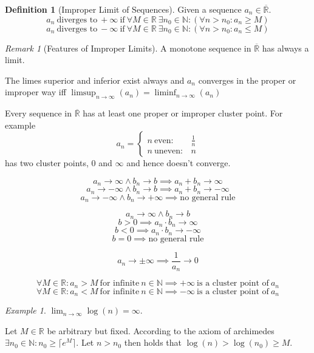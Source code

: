 \documentclass[english,titlepage]{uzhpub}
\theoremstyle{definition}
\newtheorem{definition}{Definition}[section]
\theoremstyle{plain}
\theoremstyle{remark}
\newtheorem*{remark}{Remark}
\theoremstyle{example}
\newtheorem*{example}{Example}
\begin{document}
   \begin{definition}[Improper Limit of Sequences]
      Given a sequence \(a_n \in \overline{\mathbb{R}}\).
      \[a_n~\text{diverges to}~+\infty~\text{if}~\forall M \in \mathbb{R}~\exists n_0 \in \mathbb{N}: (\forall n > n_0: a_n \geq M)\]
      \[a_n~\text{diverges to}~-\infty~\text{if}~\forall M \in \mathbb{R}~\exists n_0 \in \mathbb{N}: (\forall n > n_0: a_n \leq M)\]
   \end{definition}
   \begin{remark}[Features of Improper Limits]
      A monotone sequence in \(\overline{\mathbb{R}}\) has always a limit.

      The limes superior and inferior exist always and \(a_n\) converges in the proper or improper way iff \(\limsup_{n \to \infty}(a_n) = \liminf_{n \to \infty}(a_n)\)

      Every sequence in \(\overline{\mathbb{R}}\) has at least one proper or improper cluster point.
      For example
      \[a_n = \begin{cases} n~\text{even}: & \frac{1}{n}\\ n~\text{uneven}: & n\end{cases}\]
      has two cluster points, 0 and \(\infty\) and hence doesn't converge.

      \[a_n \to \infty \land b_n \to b \implies a_n + b_n \to \infty\]
      \[a_n \to -\infty \land b_n \to b \implies a_n + b_n \to -\infty\]
      \[a_n \to -\infty \land b_n \to +\infty \implies \text{no general rule}\]

      \[a_n \to \infty \land b_n \to b\]
      \[b > 0 \implies a_n \cdot b_n \to \infty\]
      \[b < 0 \implies  a_n \cdot b_n \to -\infty\]
      \[b = 0 \implies \text{no general rule}\]

      \[a_n \to \pm\infty \implies \frac{1}{a_n} \to 0\]

      \[\forall M \in \mathbb{R}: a_n > M~\text{for infinite}~n \in \mathbb{N} \implies +\infty~\text{is a cluster point of}~a_n\]
      \[\forall M \in \mathbb{R}: a_n < M~\text{for infinite}~n \in \mathbb{N} \implies -\infty~\text{is a cluster point of}~a_n\]
   \end{remark}

   \begin{example}
      \(\lim_{n \to \infty} \log(n) = \infty\).

      Let \(M \in \mathbb{R}\) be arbitrary but fixed.
      According to the axiom of archimedes \(\exists n_0 \in \mathbb{N}: n_0 \geq \lceil e^M \rceil\).
      Let \(n > n_0\) then holds that \(\log(n) > \log(n_0) \geq M\).
   \end{example}
\end{document}
